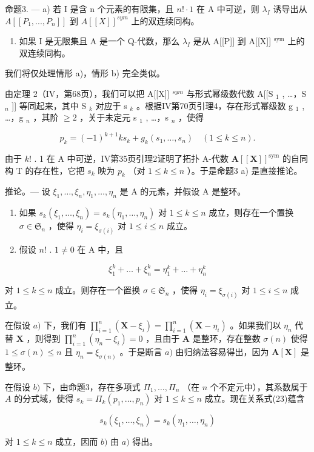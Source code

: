 命题3. --- a) 若 I 是含 n 个元素的有限集，且 \(n! \cdot 1\) 在 A 中可逆，则 \(\lambda_{I}\) 诱导出从 \(A[[P_{1}, ..., P_{n}]]\) 到 \(A[[X]]^{sym}\) 上的双连续同构。

\begin{enumerate}
\def\labelenumi{\alph{enumi})}
\setcounter{enumi}{1}
\tightlist
\item
  如果 I 是无限集且 A 是一个 Q-代数，那么 \(\lambda_{I}\) 是从 A{[}{[}P{]}{]} 到 A{[}{[}X{]}{]} \(^{\text{sym}}\) 上的双连续同构。
\end{enumerate}

我们将仅处理情形 a)，情形 b) 完全类似。

由定理 2（IV，第68页），我们可以把 A{[}{[}X{]}{]} \(^{sym}\) 与形式幂级数代数 A{[}{[}S \(_1\) , \ldots，S \(_n\) {]}{]} 等同起来，其中 S \(_k\) 对应于 s \(_k\) 。根据IV第70页引理4，存在形式幂级数 g \(_1\) , \ldots，g \(_n\) ，其阶 \(\geqslant 2\) ，关于未定元 s \(_1\) , \ldots，s \(_n\) ，使得

\[
p _ {k} = (- 1) ^ {k + 1} k s _ {k} + g _ {k} (s _ {1}, \dots , s _ {n}) \quad (1 \leqslant k \leqslant n).
\]

由于 \(k!\) . 1 在 A 中可逆，IV第35页引理2证明了拓扑 A-代数 \(\mathbf{A}[[\mathbf{X}]]^{\mathrm{sym}}\) 的自同构 T 的存在性，它把 \(s_k\) 映为 \(p_k\) （对 \(1 \leqslant k \leqslant n\) ）。于是命题3 a) 是直接推论。

推论。--- 设 \(\xi_1, \ldots, \xi_n, \eta_1, \ldots, \eta_n\) 是 A 的元素，并假设 A 是整环。

\begin{enumerate}
\def\labelenumi{\alph{enumi})}
\item
  如果 \(s_k(\xi_1, \ldots, \xi_n) = s_k(\eta_1, \ldots, \eta_n)\) 对 \(1 \leqslant k \leqslant n\) 成立，则存在一个置换 \(\sigma \in \mathfrak{S}_n\) ，使得 \(\eta_i = \xi_{\sigma(i)}\) 对 \(1 \leqslant i \leqslant n\) 成立。
\item
  假设 \(n!\) . \(1 \neq 0\) 在 A 中，且
\end{enumerate}

\[
\xi_ {1} ^ {k} + \dots + \xi_ {n} ^ {k} = \eta_ {1} ^ {k} + \dots + \eta_ {n} ^ {k}\tag{23}
\]

对 \(1 \leqslant k \leqslant n\) 成立。则存在一个置换 \(\sigma \in \mathfrak{S}_n\) ，使得 \(\eta_i = \xi_{\sigma(i)}\) 对 \(1 \leqslant i \leqslant n\) 成立。

在假设 \(a)\) 下，我们有 \(\prod_{i=1}^{n} (\mathbf{X} - \xi_i) = \prod_{i=1}^{n} (\mathbf{X} - \eta_i)\) 。如果我们以 \(\eta_n\) 代替 \(\mathbf{X}\) ，则得到 \(\prod_{i=1}^{n} (\eta_n - \xi_i) = 0\) ，且由于 \(\mathbf{A}\) 是整环，存在整数 \(\sigma(n)\) 使得 \(1 \leqslant \sigma(n) \leqslant n\) 且 \(\eta_n = \xi_{\sigma(n)}\) 。于是断言 \(a)\) 由归纳法容易得出，因为 \(\mathbf{A}[\mathbf{X}]\) 是整环。

在假设 \(b)\) 下，由命题3，存在多项式 \(\Pi_1, \ldots, \Pi_n\) （在 \(n\) 个不定元中），其系数属于 \(A\) 的分式域，使得 \(s_k = \Pi_k(p_1, \ldots, p_n)\) 对 \(1 \leqslant k \leqslant n\) 成立。现在关系式(23)蕴含

\[
s _ {k} (\xi_ {1}, \dots , \xi_ {n}) = s _ {k} (\eta_ {1}, \dots , \eta_ {n})
\]

对 \(1 \leqslant k \leqslant n\) 成立，因而 \(b)\) 由 \(a)\) 得出。

